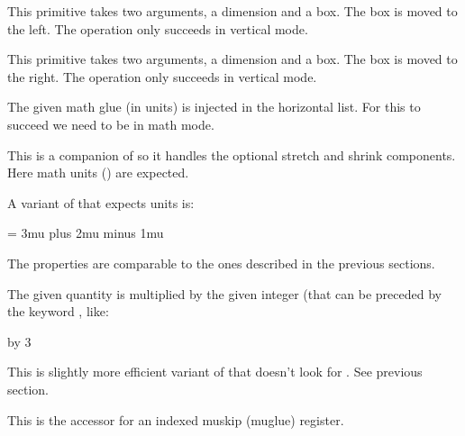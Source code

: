 This primitive takes two arguments, a dimension and a box. The box is moved to
the left. The operation only succeeds in vertical mode.

\stopoldprimitive

\startoldprimitive[title={\prm {moveright}}]

This primitive takes two arguments, a dimension and a box. The box is moved to
the right. The operation only succeeds in vertical mode.

\stopoldprimitive

\startoldprimitive[title={\prm {mskip}}]

The given math glue (in  units) is injected in the horizontal list. For
this to succeed we need to be in math mode.

\stopoldprimitive

\startoldprimitive[title={\prm {muexpr}}]

This is a companion of  so it handles the optional stretch and
shrink components. Here math units () are expected.

\stopoldprimitive

\startnewprimitive[title={\prm {mugluespecdef}}]

A variant of  that expects  units is:

\starttyping
\mugluespecdef\MyGlue = 3mu plus 2mu minus 1mu
\stoptyping

The properties are comparable to the ones described in the previous sections.

\stopnewprimitive

\startoldprimitive[title={\prm {multiply}}]

The given quantity is multiplied by the given integer (that can be preceded by
the keyword , like:

\starttyping
\scratchdimen=10pt \multiply\scratchdimen by 3
\stoptyping

\stopoldprimitive

\startnewprimitive[title={\prm {multiplyby}}]

This is slightly more efficient variant of  that doesn't look for
. See previous section.

\stopnewprimitive

\startoldprimitive[title={\prm {muskip}}]

This is the accessor for an indexed muskip (muglue) register.

\stopoldprimitive

